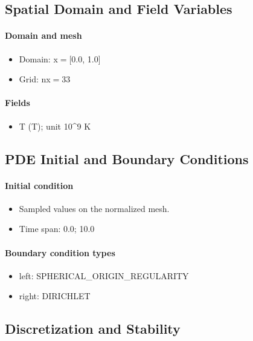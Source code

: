 \documentclass[11pt]{article}
\begin{document}
\subsection{Spatial Domain and Field Variables}

\paragraph{Domain and mesh}
\begin{itemize}\raggedright
\item Domain: x\ensuremath{=}[0.0, 1.0]
\item Grid: nx\ensuremath{=}33
\end{itemize}

\paragraph{Fields}
\begin{itemize}\raggedright
\item T (T); unit 10\textasciicircum{}9 K
\end{itemize}

\subsection{PDE Initial and Boundary Conditions}

\paragraph{Initial condition}
\begin{itemize}\raggedright
\item Sampled values on the normalized mesh.
\item Time span: 0.0; 10.0
\end{itemize}

\paragraph{Boundary condition types}
\begin{itemize}\raggedright
\item left: SPHERICAL\_\allowbreak{}ORIGIN\_\allowbreak{}REGULARITY
\item right: DIRICHLET
\end{itemize}

\subsection{Discretization and Stability}
\end{document}
